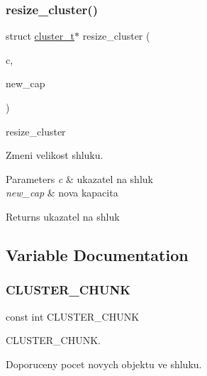 \subsubsection{\texorpdfstring{resize\+\_\+cluster()}{resize\_cluster()}}
{\footnotesize\ttfamily struct \hyperlink{structcluster__t}{cluster\+\_\+t}$\ast$ resize\+\_\+cluster (\begin{DoxyParamCaption}\item[{struct \hyperlink{structcluster__t}{cluster\+\_\+t} $\ast$}]{c,  }\item[{int}]{new\+\_\+cap }\end{DoxyParamCaption})}



resize\+\_\+cluster 

Zmeni velikost shluku. 
\begin{DoxyParams}{Parameters}
{\em c} & ukazatel na shluk \\
\hline
{\em new\+\_\+cap} & nova kapacita \\
\hline
\end{DoxyParams}
\begin{DoxyReturn}{Returns}
ukazatel na shluk 
\end{DoxyReturn}


\subsection{Variable Documentation}
\hypertarget{group__Prace__se__shluky_gafb09f2bf4615f5ac7a91807aa086d4c3}{}\label{group__Prace__se__shluky_gafb09f2bf4615f5ac7a91807aa086d4c3} 
\subsubsection{\texorpdfstring{C\+L\+U\+S\+T\+E\+R\+\_\+\+C\+H\+U\+NK}{CLUSTER\_CHUNK}}
{\footnotesize\ttfamily const int C\+L\+U\+S\+T\+E\+R\+\_\+\+C\+H\+U\+NK}



C\+L\+U\+S\+T\+E\+R\+\_\+\+C\+H\+U\+NK. 

Doporuceny pocet novych objektu ve shluku. 